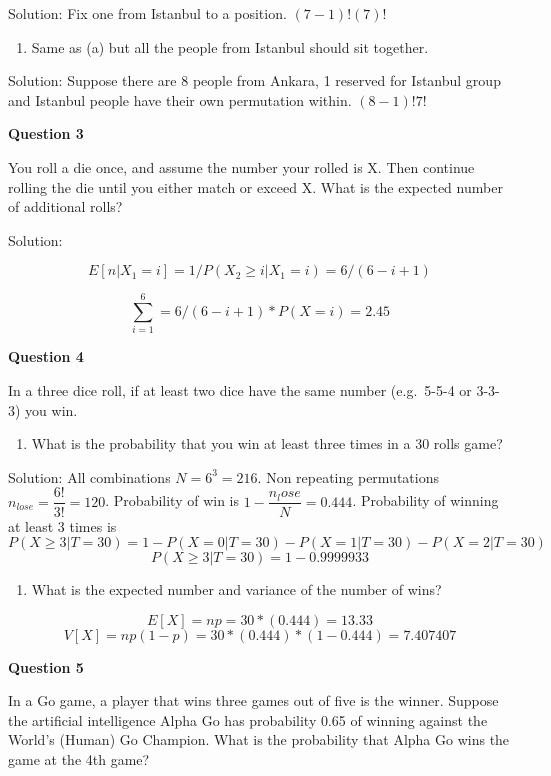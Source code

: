 \documentclass[]{book}
\providecommand{\tightlist}{%
  \setlength{\itemsep}{0pt}\setlength{\parskip}{0pt}}
\theoremstyle{definition}
\theoremstyle{definition}
\theoremstyle{definition}
\theoremstyle{remark}
\begin{document}
Solution: Fix one from Istanbul to a position. \((7-1)!(7)!\)

\begin{enumerate}
\def\labelenumi{\alph{enumi})}
\setcounter{enumi}{2}
\tightlist
\item
  Same as (a) but all the people from Istanbul should sit together.
\end{enumerate}

Solution: Suppose there are 8 people from Ankara, 1 reserved for
Istanbul group and Istanbul people have their own permutation within.
\((8-1)!7!\)

\textbf{Question 3}

You roll a die once, and assume the number your rolled is X. Then
continue rolling the die until you either match or exceed X. What is the
expected number of additional rolls?

Solution:

\[E[n|X_1=i] = 1/P(X_2 \ge i| X_1 = i) = 6/(6-i+1)\]

\[\sum_{i=1}^6 = 6/(6-i+1) * P(X=i) = 2.45\]

\textbf{Question 4}

In a three dice roll, if at least two dice have the same number
(e.g.~5-5-4 or 3-3-3) you win.

\begin{enumerate}
\def\labelenumi{\alph{enumi})}
\tightlist
\item
  What is the probability that you win at least three times in a 30
  rolls game?
\end{enumerate}

Solution: All combinations \(N = 6^3 = 216\). Non repeating permutations
\(n_{lose} = \dfrac{6!}{3!} = 120\). Probability of win is
\(1 - \dfrac{n_lose}{N} = 0.444\). Probability of winning at least 3
times is
\[P(X \ge 3| T = 30) = 1 - P(X = 0|T=30) - P(X = 1|T=30) - P(X=2|T=30)\]
\[P(X \ge 3| T = 30) = 1 - 0.9999933\]

\begin{enumerate}
\def\labelenumi{\alph{enumi})}
\setcounter{enumi}{1}
\tightlist
\item
  What is the expected number and variance of the number of wins?
\end{enumerate}

\[E[X] = np = 30*(0.444) = 13.33\]
\[V[X] = np(1-p) = 30*(0.444)*(1-0.444) = 7.407407\]

\textbf{Question 5}

In a Go game, a player that wins three games out of five is the winner.
Suppose the artificial intelligence Alpha Go has probability 0.65 of
winning against the World's (Human) Go Champion. What is the probability
that Alpha Go wins the game at the 4th game?
\end{document}
